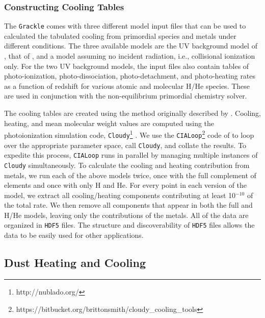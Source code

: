 \subsubsection{Constructing Cooling Tables} \label{sec:cooling-tables}

The \texttt{Grackle} comes with three different model input files that can be
used to calculated the tabulated cooling from primordial species and
metals under different conditions.  The three available models are the
UV background model of \citet{2009ApJ...703.1416F}, that of
\citet{2012ApJ...746..125H}, and a model assuming no incident
radiation, i.e., collisional ionization only.  For the two UV
background models, the input files also contain tables of
photo-ionization, photo-dissociation, photo-detachment, and
photo-heating rates as a function of redshift for various atomic and
molecular H/He species.  These are used in conjunction with the
non-equilibrium primordial chemistry solver.

The cooling tables are
created using the method originally described by
\citet{2008MNRAS.385.1443S}.  Cooling, heating, and mean molecular
weight values are computed using the photoionization simulation code, 
\texttt{Cloudy}\footnote{http://nublado.org/}
\citep{2013RMxAA..49..137F}.  We use the
\texttt{CIALoop}\footnote{https://bitbucket.org/brittonsmith/cloudy\_cooling\_tools}
code of \citet{2008MNRAS.385.1443S} to loop over the appropriate
parameter space, call \texttt{Cloudy}, and collate the results.  To
expedite this process, \texttt{CIALoop} runs in parallel by managing
multiple instances of \texttt{Cloudy} simultaneously.  To calculate
the cooling and heating contribution from metals, we run each of the
above models twice, once with the full complement of elements and once
with only H and He.  For every point in each version of the model, we
extract all cooling/heating components contributing at least
10$^{-10}$ of the total rate.  We then remove all components that
appear in both the full and H/He models, leaving only the
contributions of the metals.  All of the data are organized in
\texttt{HDF5} files.  The structure and discoverability of
\texttt{HDF5} files allows the data to be easily used for other
applications.


\subsection{Dust Heating and Cooling}

